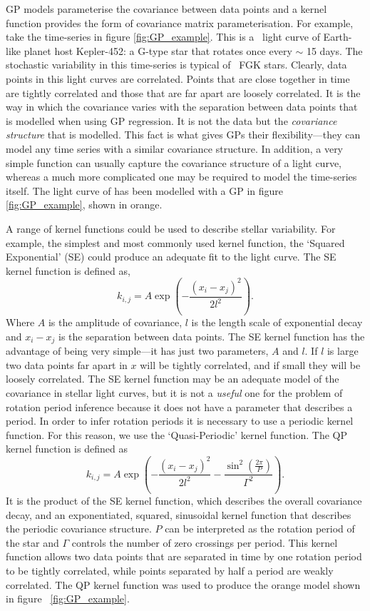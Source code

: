 GP models parameterise the covariance between data points and a kernel
function provides the form of covariance matrix parameterisation.
For example, take the time-series in figure \ref{fig:GP_example}.
This is a \kepler\ light curve of Earth-like planet host Kepler-452: a G-type
star that rotates once every $\sim$ 15 days.
The stochastic variability in this time-series is typical of \kepler\ FGK
stars.
Clearly, data points in this light curves are correlated.
Points that are close together in time are tightly correlated and those that
are far apart are loosely correlated.
It is the way in which the covariance varies with the separation between data
points that is modelled when using GP regression.
It is not the data but the {\it covariance structure} that is modelled.
This fact is what gives GPs their flexibility---they can model any time
series with a similar covariance structure.
In addition, a very simple function can usually capture the covariance
structure of a light curve, whereas a much more complicated one may be
required to model the time-series itself.
The light curve of  has been modelled with a GP in figure
\ref{fig:GP_example}, shown in orange.

A range of kernel functions could be used to describe stellar variability.
For example, the simplest and most commonly used kernel function, the
`Squared Exponential' (SE) could produce an adequate fit to the 
light curve.
The SE kernel function is defined as,
\begin{equation}
k_{i,j} = A \exp \left(-\frac{(x_i - x_j)^2}{2l^2} \right).
\end{equation}
\label{eq:SE}
Where $A$ is the amplitude of covariance, $l$ is the length scale of
exponential decay and $x_i-x_j$ is the separation between data points.
The SE kernel function has the advantage of being very simple---it has just
two parameters, $A$ and $l$.
If $l$ is large two data points far apart in $x$ will be tightly correlated,
and if small they will be loosely correlated.
The SE kernel function may be an adequate model of the covariance in stellar
light curves, but it is not a {\it useful} one for the problem of rotation
period inference because it does not have a parameter that describes a period.
In order to infer rotation periods it is necessary to use a periodic kernel
function.
For this reason, we use the `Quasi-Periodic' kernel function.
The QP kernel function is defined as
\begin{equation}
k_{i,j} = A \exp \left(-\frac{(x_i - x_j)^2}{2l^2} -
\frac{\sin^2(\frac{2\pi}{P})}{\Gamma^2} \right).
\end{equation}
\label{eq:QP}
It is the product of the SE kernel function, which describes the overall
covariance decay, and an exponentiated, squared, sinusoidal kernel function
that describes the periodic covariance structure.
$P$ can be interpreted as the rotation period of the star and $\Gamma$
controls the number of zero crossings per period.
This kernel function allows two data points that are separated in time by one
rotation period to be tightly correlated, while points separated by half a
period are weakly correlated.
The QP kernel function was used to produce the orange model shown in figure
~\ref{fig:GP_example}.

